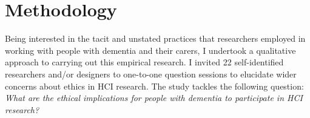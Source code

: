 
\section{Methodology}
\label{Ethics:Methodology}
Being interested in the tacit and unstated practices that researchers employed in working with people with dementia and their carers, I undertook a qualitative approach to carrying out this empirical research. I invited 22 self-identified researchers and/or designers to one-to-one question sessions to elucidate wider concerns about ethics in HCI research. The study tackles the following question: \textit{What are the ethical implications for people with dementia to participate in HCI research?}

